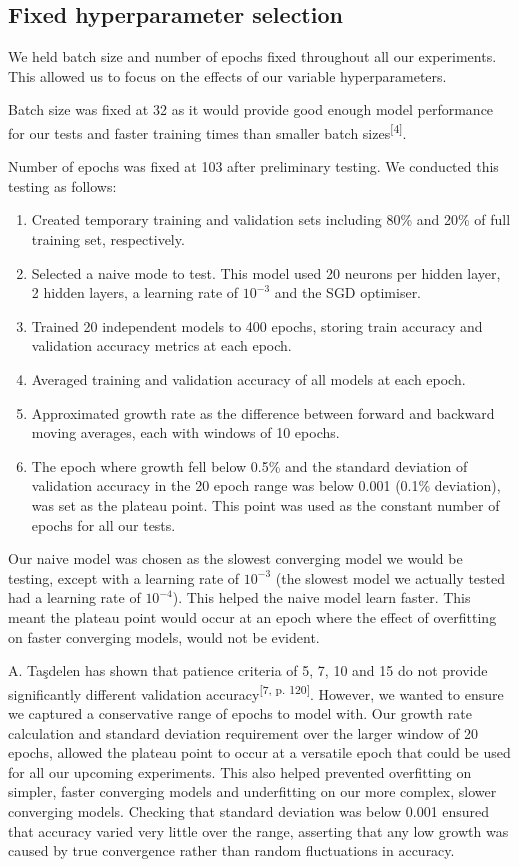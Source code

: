 \documentclass[conference]{IEEEtran}
\begin{document}
\subsection{Fixed hyperparameter selection}
We held batch size and number of epochs fixed throughout all our experiments. This allowed us to focus on the effects of our variable hyperparameters.  

Batch size was fixed at 32 as it would provide good enough model performance for our tests and faster training times than smaller batch sizes\textsuperscript{[4]}.

Number of epochs was fixed at 103 after preliminary testing. 
We conducted this testing as follows: 
\begin{enumerate}
    \item Created temporary training and validation sets including 80\% and 20\% of full training set, respectively.
    \item Selected a naive mode to test. This model used 20 neurons per hidden layer, 2 hidden layers, a learning rate of $10^{-3}$ and the SGD optimiser.
    \item Trained 20 independent models to 400 epochs, storing train accuracy and validation accuracy metrics at each epoch.
    \item Averaged training and validation accuracy of all models at each epoch.
    \item Approximated growth rate as the difference between forward and backward moving averages, each with windows of 10 epochs.
    \item The epoch where growth fell below 0.5\% and the standard deviation of validation accuracy in the 20 epoch range was below 0.001 (0.1\% deviation), was set as the plateau point. This point was used as the constant number of epochs for all our tests.
\end{enumerate}
Our naive model was chosen as the slowest converging model we would be testing, except with a learning rate of $10^{-3}$ (the slowest model we actually tested had a learning rate of $10^{-4}$). This helped the naive model learn faster. This meant the plateau point would  occur at an epoch where the effect of overfitting on faster converging models, would not be evident.

A. Taşdelen has shown that patience criteria of 5, 7, 10 and 15 do not provide significantly different validation accuracy\textsuperscript{[7, p. 120]}. However, we wanted to ensure we captured a conservative range of epochs to model with. Our growth rate calculation and standard deviation requirement over the larger window of 20 epochs, allowed the plateau point to occur at a versatile epoch that could be used for all our upcoming experiments. This also helped prevented overfitting on simpler, faster converging models and underfitting on our more complex, slower converging models. Checking that standard deviation was below 0.001 ensured that accuracy varied very little over the range, asserting that any low growth was caused by true convergence rather than random fluctuations in accuracy.
\end{document}
